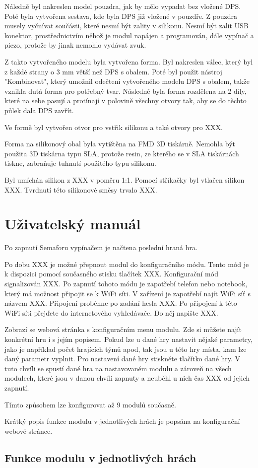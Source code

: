 
Náledně byl nakreslen model pouzdra, jak by mělo vypadat bez vložené DPS. Poté byla vytvořena sestava, kde byla DPS již vložené v pouzdře. Z pouzdra musely vyčnívat součásti, které nesmí být 
zality v silikonu. Nesmí být zalit USB konektor, prostřednictvím něhož je modul napájen a programován, dále vypínač a piezo, protože by jinak nemohlo vydávat zvuk. 

Z takto vytvořeného modelu byla vytvořena forma. Byl nakreslen válec, který byl z každé strany o 3 mm větší než DPS s obalem. Poté byl použit nástroj "Kombinovat", který umožnil odečtení vytvořeného 
modelu DPS s obalem, takže vznikla dutá forma pro potřebný tvar. Následně byla forma rozdělena na 2 díly, které na sebe pasují a protínají v polovině všechny otvory tak, aby se do těchto půlek 
dala DPS zavřít.

Ve formě byl vytvořen otvor pro vstřik silikonu a také otvory pro XXX.

Forma na silikonový obal byla vytištěna na FMD 3D tiskárně. Nemohla být použita 3D tiskárna typu SLA, protože resin, ze kterého se v SLA tiskárnách tiskne, zabraňuje tuhnutí použitého typu silikonu. 


Byl umíchán silikon z XXX v poměru 1:1. Pomocí stříkačky byl vtlačen silikon XXX. 
Tvrdnutí této silikonové směsy trvalo XXX. 



\chapter{Uživatelský manuál}
Po zapnutí Semaforu vypínačem je načtena poslední hraná hra. 

Po dobu XXX je možné přepnout modul do konfiguračního módu. Tento mód je k dispozici pomocí současného stisku tlačítek XXX. Konfigurační mód signalizován XXX. Po zapnutí tohoto módu je zapotřebí telefon 
nebo notebook, který má možnost připojit se k WiFi síti. V zařízení je zapotřebí najít WiFi síť s názvem XXX. Připojení proběhne po zadání hesla XXX. Po připojení k této WiFi síti přejďete do internetového 
vyhledávače. Do něj napište XXX. 

Zobrazí se webová stránka s konfiguračním menu modulu. Zde si můžete najít konkrétní hru i s jejím popisem. Pokud lze u dané hry nastavit nějaké parametry, jako je například počet hrajících týmů apod, tak 
jsou u této hry místa, kam lze daný parametr vyplnit. Pro nastavení dané hry stiskněte tlačítko dané hry. V tuto chvíli se spustí dané hra na nastavovaném modulu a zároveň na všech modulech, které jsou v danou
chvíli zapnuty a neuběhl u nich čas XXX od jejich zapnutí. 

Tímto způsobem lze konfigurovat až 9 modulů současně. 

Krátký popis funkce modulu v jednotlivých hrách je popsána na konfigurační webové stránce. 

\section{Funkce modulu v jednotlivých hrách}





